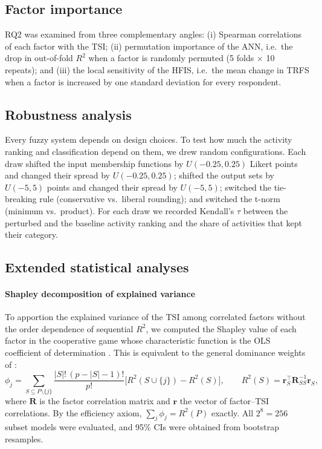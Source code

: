 \documentclass[pdflatex,sn-basic]{sn-jnl}%
\theoremstyle{plain}
\theoremstyle{remark}
\begin{document}
\subsection{Factor importance}
RQ2 was examined from three complementary angles: (i) Spearman correlations of each factor with the TSI; (ii) permutation importance of the ANN, i.e.\ the drop in out-of-fold $R^2$ when a factor is randomly permuted (5 folds $\times$ 10 repeats); and (iii) the local sensitivity of the HFIS, i.e.\ the mean change in TRFS when a factor is increased by one standard deviation for every respondent.

\subsection{Robustness analysis}
Every fuzzy system depends on design choices. To test how much the activity ranking and classification depend on them, we drew \RobDraws{} random configurations. Each draw shifted the input membership functions by $U(-0.25,0.25)$ Likert points and changed their spread by $U(-0.25,0.25)$; shifted the output sets by $U(-5,5)$ points and changed their spread by $U(-5,5)$; switched the tie-breaking rule (conservative vs.\ liberal rounding); and switched the t-norm (minimum vs.\ product). For each draw we recorded Kendall's $\tau$ between the perturbed and the baseline activity ranking and the share of activities that kept their category.

\subsection{Extended statistical analyses}
\label{sec:extended-methods}
\paragraph{Shapley decomposition of explained variance} To apportion the explained variance of the TSI among correlated factors without the order dependence of sequential $R^2$, we computed the Shapley value of each factor in the cooperative game whose characteristic function is the OLS coefficient of determination \citep{lipovetsky2001}. This is equivalent to the general dominance weights of \citet{budescu1993}:
\begin{equation}
\phi_j=\sum_{S\subseteq P\setminus\{j\}}\frac{|S|!\,(p-|S|-1)!}{p!}\Big[R^2(S\cup\{j\})-R^2(S)\Big],\qquad R^2(S)=\mathbf{r}_S^{\top}\mathbf{R}_{SS}^{-1}\mathbf{r}_S,
\label{eq:shapley}
\end{equation}
where $\mathbf{R}$ is the factor correlation matrix and $\mathbf{r}$ the vector of factor--TSI correlations. By the efficiency axiom, $\sum_j\phi_j=R^2(P)$ exactly. All $2^8=256$ subset models were evaluated, and 95\% CIs were obtained from \ShapB{} bootstrap resamples.
\end{document}
